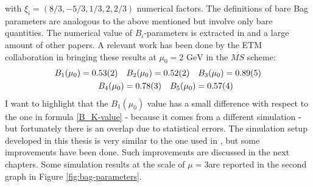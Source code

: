 \documentclass[english, LaM, oneside, noexaminfo]{sapthesis}
\newcommand{\gev}{\text{ GeV}}
\begin{document}
with $\xi_i = \left(8/3, -5/3, 1/3, 2, 2/3\right)$ numerical factors.
The definitions of bare Bag parameters are analogous to the above mentioned but involve only bare quantities.
The numerical value of $B_i$-parameters is extracted in \cite{Bparameters} and a large amount of other papers.
A relevant work has been done by the ETM collaboration in \cite{KMBSM} bringing these results at $\mu_0 = 2\gev$ in the $\overline{MS}$ scheme:
\begin{equation}\label{eq:b_i-in-kmbsm}
    \begin{aligned}
        & B_1(\mu_0) = 0.53(2) \quad B_2(\mu_0) = 0.52(2) \quad B_3(\mu_0) = 0.89(5) \\
        & \hspace*{18mm} B_4(\mu_0) = 0.78(3) \quad B_5(\mu_0) = 0.57(4)
    \end{aligned}
\end{equation}
I want to highlight that the $B_1(\mu_0)$ value has a small difference with respect to the one in formula \ref{B_K-value} - because it comes from a different simulation - but fortunately there is an overlap due to statistical errors.
The simulation setup developed in this thesis is very similar to the one used in \cite{KMBSM}, but some improvements have been done.
Such improvements are discussed in the next chapters.
Some simulation results at the scale of $\mu=3$\gev\space are reported in the second graph in Figure \ref{fig:bag-parameters}.
\end{document}
